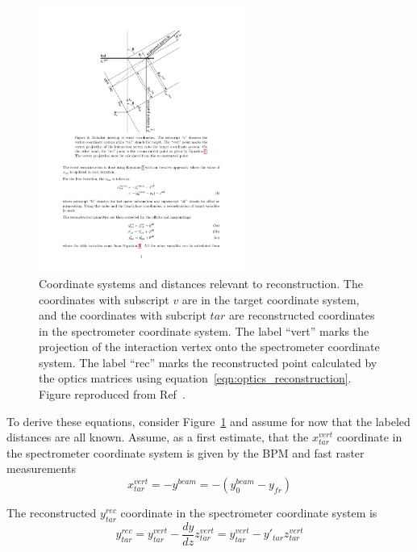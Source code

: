 \begin{figure}[!h]
    \centering
    \includegraphics[width=0.6\textwidth]{chap4/optics_coordinates.pdf}
    \caption{
            Coordinate systems and distances relevant to reconstruction.
            The coordinates with subscript $v$ are in the target coordinate
            system,
            and the coordinates with subcript $tar$ are reconstructed
            coordinates in the spectrometer coordinate system.
            The label ``vert'' marks the projection of the interaction vertex
            onto the spectrometer coordinate system.
            The label ``rec'' marks the reconstructed point calculated by the
            optics matrices using equation~\ref{eqn:optics_reconstruction}.
            Figure reproduced from Ref~\cite{Bericic_2017}.
            }
    \label{fig:optics_coordinates}
\end{figure}

To derive these equations, consider Figure~\ref{fig:optics_coordinates} and
assume for now that the labeled distances are all known.
Assume, as a first estimate, that the $x^{vert}_{tar}$ coordinate in the
spectrometer coordinate system is given by the BPM and fast raster measurements
\begin{equation}
    x^{vert}_{tar} = -y^{beam} = -(y_0^{beam} - y_{fr})
\end{equation}

The reconstructed $y^{rec}_{tar}$ coordinate in the spectrometer coordinate
system is
\begin{equation} \label{eqn:yrectar}
    y^{rec}_{tar} = y^{vert}_{tar} - \frac{dy}{dz} z^{vert}_{tar}
                  = y^{vert}_{tar} - y'_{tar} z^{vert}_{tar}
\end{equation}

